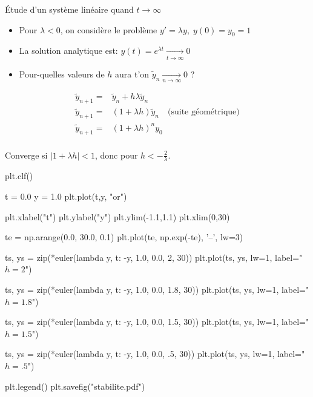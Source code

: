 \documentclass{beamer}
\begin{document}
\begin{frame}{Étude d'un système linéaire quand $t \rightarrow \infty$}
    \begin{itemize}
        \item Pour $\lambda < 0 $, on considère le problème $ y'=\lambda y,\; y(0) = y_0 = 1$
        \item La solution analytique est: $ y(t) = e^{\lambda t} \xrightarrow[t \rightarrow \infty]{} 0$

        \item Pour-quelles valeurs de $h$ aura t'on $\widetilde{y}_n \xrightarrow[n \rightarrow \infty]{} 0$ ?
    \end{itemize}
    \vfill
    \begin{align*}
        \widetilde{y}_{n+1} = & \widetilde{y}_n + h\lambda\widetilde{y}_n                     \\
        \widetilde{y}_{n+1} = & (1+\lambda h)\widetilde{y}_n \quad \text{(suite géométrique)} \\
        \widetilde{y}_{n+1} = & (1+\lambda h)^ny_0                                            \\
    \end{align*}

    Converge si $|1+\lambda h| < 1$, donc pour $h < -\frac{2}{\lambda}$.
\end{frame}

\begin{pycode}
    plt.clf()

    t = 0.0
    y = 1.0
    plt.plot(t,y, "or")

    plt.xlabel("t")
    plt.ylabel("y")
    plt.ylim(-1.1,1.1)
    plt.xlim(0,30)

    te = np.arange(0.0, 30.0, 0.1)
    plt.plot(te, np.exp(-te), '--', lw=3)

    ts, ys = zip(*euler(lambda y, t: -y, 1.0, 0.0, 2, 30))
    plt.plot(ts, ys, lw=1, label="$h=2$")

    ts, ys = zip(*euler(lambda y, t: -y, 1.0, 0.0, 1.8, 30))
    plt.plot(ts, ys, lw=1, label="$h=1.8$")

    ts, ys = zip(*euler(lambda y, t: -y, 1.0, 0.0, 1.5, 30))
    plt.plot(ts, ys, lw=1, label="$h=1.5$")

    ts, ys = zip(*euler(lambda y, t: -y, 1.0, 0.0, .5, 30))
    plt.plot(ts, ys, lw=1, label="$h=.5$")


    plt.legend()
    plt.savefig("stabilite.pdf")
\end{pycode}
\end{document}
